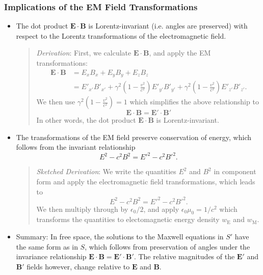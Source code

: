 \documentclass[11pt, a4paper]{article}
\renewcommand{\vec}[1]{\bm{#1}} %
\newcommand{\E}{\vec{E}} %
\newcommand{\B}{\vec{B}} %
\newcommand{\ee}{\epsilon_{0}}  %
\newcommand{\mm}{\mu_{0}}  %
\begin{document}
\subsubsection{Implications of the EM Field Transformations}
\begin{itemize}
    
    \item The dot product $ \E \cdot \B $ is Lorentz-invariant (i.e. angles are preserved) with respect to the Lorentz transformations of the electromagnetic field.
    \begin{quote}
        \textit{Derivation}: First, we calculate $ \E \cdot \B $, and apply the EM transformations:
        \begin{align*}
            \E \cdot \B &= E_{x}B_{x} + E_{y}B_{y} + E_{z}B_{z} \\
            & = E'_{x'}B'_{x'} + \gamma^{2}\left(1 - \frac{v^{2}}{c^{2}}\right)E'_{y'}B'_{y'} + \gamma^{2}\left(1 - \frac{v^{2}}{c^{2}}\right)E'_{z'}B'_{z'}.
        \end{align*}
        We then use $ \gamma^{2}(1 - \frac{v^{2}}{c^{2}}) = 1 $ which simplifies the above relationship to
        \begin{equation*}
            \E \cdot \B = \E' \cdot \B'
        \end{equation*}
        In other words, the dot product $ \E \cdot \B $ is Lorentz-invariant.
    \end{quote}

    \item The transformations of the EM field preserve conservation of energy, which follows from the invariant relationship
	\begin{equation*}
		 E^{2} - c^{2}B^{2} =  E'^{2} - c^{2}B'^{2}.
	\end{equation*}
    \begin{quote} %
        \textit{Sketched Derivation}: We write the quantities $ E^{2} $ and $ B^{2} $ in component form and apply the electromagnetic field transformations, which leads to
	\begin{equation*}
		 E^{2} - c^{2}B^{2} =  E'^{2} - c^{2}B'^{2}.
	\end{equation*}
        We then multiply through by $ \ee/2 $, and apply $ \ee \mm = 1/c^{2} $ which transforms the quantities to electomagnetic energy density $ w_{\text{E}} $ and $ w_{\text{M}} $.
    \end{quote}

    \item Summary: In free space, the solutions to the Maxwell equations in $ S' $ have the same form as in $ S $, which follows from preservation of angles under the invariance relationship $ \E \cdot \B = \E' \cdot \B' $. The relative magnitudes of the $ \E' $ and $ \B' $ fields however, change relative to $ \E $ and $ \B $.
\end{itemize}
\end{document}
